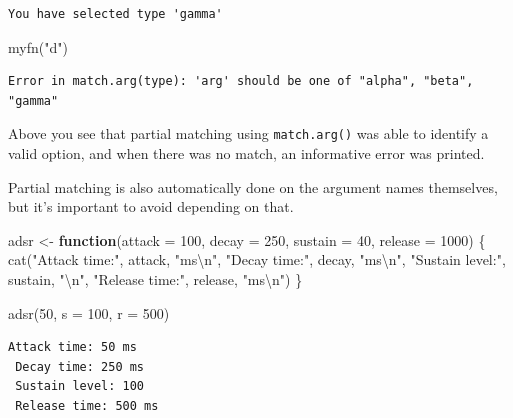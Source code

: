 \documentclass[
]{book}
\newenvironment{Shaded}{\begin{snugshade}}{\end{snugshade}}
\newcommand{\AttributeTok}[1]{\textcolor[rgb]{0.77,0.63,0.00}{#1}}
\newcommand{\ControlFlowTok}[1]{\textcolor[rgb]{0.13,0.29,0.53}{\textbf{#1}}}
\newcommand{\DecValTok}[1]{\textcolor[rgb]{0.00,0.00,0.81}{#1}}
\newcommand{\FunctionTok}[1]{\textcolor[rgb]{0.00,0.00,0.00}{#1}}
\newcommand{\NormalTok}[1]{#1}
\newcommand{\OtherTok}[1]{\textcolor[rgb]{0.56,0.35,0.01}{#1}}
\newcommand{\SpecialCharTok}[1]{\textcolor[rgb]{0.00,0.00,0.00}{#1}}
\newcommand{\StringTok}[1]{\textcolor[rgb]{0.31,0.60,0.02}{#1}}
\begin{document}
\begin{verbatim}
You have selected type 'gamma'
\end{verbatim}

\begin{Shaded}
\begin{Highlighting}[]
\FunctionTok{myfn}\NormalTok{(}\StringTok{"d"}\NormalTok{)}
\end{Highlighting}
\end{Shaded}

\begin{verbatim}
Error in match.arg(type): 'arg' should be one of "alpha", "beta", "gamma"
\end{verbatim}

Above you see that partial matching using \texttt{match.arg()} was able to identify a valid option, and when there was no match, an informative error was printed.

Partial matching is also automatically done on the argument names themselves, but it's important to avoid depending on that.

\begin{Shaded}
\begin{Highlighting}[]
\NormalTok{adsr }\OtherTok{\textless{}{-}} \ControlFlowTok{function}\NormalTok{(}\AttributeTok{attack =} \DecValTok{100}\NormalTok{,}
                 \AttributeTok{decay =} \DecValTok{250}\NormalTok{,}
                 \AttributeTok{sustain =} \DecValTok{40}\NormalTok{,}
                 \AttributeTok{release =} \DecValTok{1000}\NormalTok{) \{}
  \FunctionTok{cat}\NormalTok{(}\StringTok{"Attack time:"}\NormalTok{, attack, }\StringTok{"ms}\SpecialCharTok{\textbackslash{}n}\StringTok{"}\NormalTok{,}
      \StringTok{"Decay time:"}\NormalTok{, decay, }\StringTok{"ms}\SpecialCharTok{\textbackslash{}n}\StringTok{"}\NormalTok{,}
      \StringTok{"Sustain level:"}\NormalTok{, sustain, }\StringTok{"}\SpecialCharTok{\textbackslash{}n}\StringTok{"}\NormalTok{,}
      \StringTok{"Release time:"}\NormalTok{, release, }\StringTok{"ms}\SpecialCharTok{\textbackslash{}n}\StringTok{"}\NormalTok{)}
\NormalTok{\}}

\FunctionTok{adsr}\NormalTok{(}\DecValTok{50}\NormalTok{, }\AttributeTok{s =} \DecValTok{100}\NormalTok{, }\AttributeTok{r =} \DecValTok{500}\NormalTok{)}
\end{Highlighting}
\end{Shaded}

\begin{verbatim}
Attack time: 50 ms
 Decay time: 250 ms
 Sustain level: 100 
 Release time: 500 ms
\end{verbatim}
\end{document}
